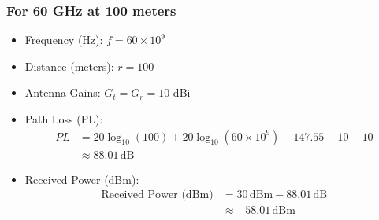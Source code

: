 \documentclass{article}
\begin{document}
\subsubsection{For 60 GHz at 100 meters}
\begin{itemize}
\item Frequency (Hz): $f = 60 \times 10^9$
\item Distance (meters): $r = 100$
\item Antenna Gains: $G_t = G_r = 10$ dBi
\item Path Loss (PL):
\begin{align*}
PL &= 20 \log_{10}(100) + 20 \log_{10}(60 \times 10^9) - 147.55 - 10 - 10 \\
&\approx 88.01 \, \text{dB}
\end{align*}
\item Received Power (dBm):
\begin{align*}
\text{Received Power (dBm)} &= 30 \, \text{dBm} - 88.01 \, \text{dB} \\
&\approx -58.01 \, \text{dBm}
\end{align*}
\end{itemize}

\end{document}
